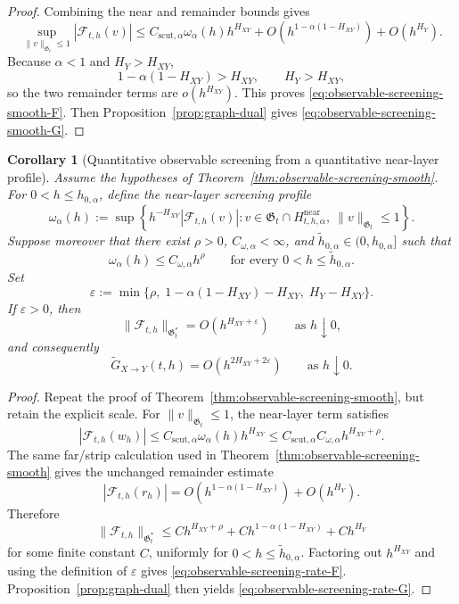 \documentclass[11pt,a4paper]{amsart}
\theoremstyle{plain}
\newtheorem{corollary}[theorem]{Corollary}
\theoremstyle{definition}
\theoremstyle{remark}
\begin{document}
\begin{proof}
Combining the near and remainder bounds gives
\[
\sup_{\|v\|_{\mathfrak G_t}\le1}
|\mathcal F_{t,h}(v)|
\le
C_{\mathrm{scut},\alpha}\omega_\alpha(h)h^{H_{XY}}
+
O\!\left(h^{1-\alpha(1-H_{XY})}\right)
+
O(h^{H_Y}).
\]
Because \(\alpha<1\) and \(H_Y>H_{XY}\),
\[
1-\alpha(1-H_{XY})>H_{XY},
\qquad
H_Y>H_{XY},
\]
so the two remainder terms are \(o(h^{H_{XY}})\). This proves
\eqref{eq:observable-screening-smooth-F}. Then Proposition~\ref{prop:graph-dual} gives
\eqref{eq:observable-screening-smooth-G}.
\end{proof}

\begin{corollary}[Quantitative observable screening from a quantitative near-layer profile]
\label{cor:observable-screening-rate}
Assume the hypotheses of Theorem~\ref{thm:observable-screening-smooth}.  For \(0<h\le h_{0,\alpha}\),
define the near-layer screening profile
\[
\omega_\alpha(h)
:=
\sup\left\{
h^{-H_{XY}}\left|\mathcal F_{t,h}(v)\right|:
v\in\mathfrak G_t\cap H_{t,h,\alpha}^{\mathrm{near}},
\ \|v\|_{\mathfrak G_t}\le1
\right\}.
\]
Suppose moreover that there exist \(\rho>0\), \(C_{\omega,\alpha}<\infty\), and
\(\widetilde h_{0,\alpha}\in(0,h_{0,\alpha}]\) such that
\[
\omega_\alpha(h)\le C_{\omega,\alpha}h^\rho
\qquad\text{for every }0<h\le \widetilde h_{0,\alpha}.
\]
Set
\[
\varepsilon
:=
\min\!\bigl\{\rho,\;1-\alpha(1-H_{XY})-H_{XY},\;H_Y-H_{XY}\bigr\}.
\]
If \(\varepsilon>0\), then
\begin{equation}\label{eq:observable-screening-rate-F}
\|\mathcal F_{t,h}\|_{\mathfrak G_t^*}
=
O(h^{H_{XY}+\varepsilon})
\qquad\text{as }h\downarrow0,
\end{equation}
and consequently
\begin{equation}\label{eq:observable-screening-rate-G}
\widetilde G_{X\to Y}(t,h)
=
O(h^{2H_{XY}+2\varepsilon})
\qquad\text{as }h\downarrow0.
\end{equation}
\end{corollary}

\begin{proof}
Repeat the proof of Theorem~\ref{thm:observable-screening-smooth}, but retain the explicit scale.
For \(\|v\|_{\mathfrak G_t}\le1\), the near-layer term satisfies
\[
|\mathcal F_{t,h}(w_h)|
\le
C_{\mathrm{scut},\alpha}\omega_\alpha(h)h^{H_{XY}}
\le
C_{\mathrm{scut},\alpha}C_{\omega,\alpha}h^{H_{XY}+\rho}.
\]
The same far/strip calculation used in Theorem~\ref{thm:observable-screening-smooth} gives the
unchanged remainder estimate
\[
|\mathcal F_{t,h}(r_h)|
=
O\!\left(h^{1-\alpha(1-H_{XY})}\right)
+
O(h^{H_Y}).
\]
Therefore
\[
\|\mathcal F_{t,h}\|_{\mathfrak G_t^*}
\le
C h^{H_{XY}+\rho}
+
C h^{1-\alpha(1-H_{XY})}
+
C h^{H_Y}
\]
for some finite constant \(C\), uniformly for \(0<h\le \widetilde h_{0,\alpha}\).  Factoring out
\(h^{H_{XY}}\) and using the definition of \(\varepsilon\) gives
\eqref{eq:observable-screening-rate-F}.  Proposition~\ref{prop:graph-dual} then yields
\eqref{eq:observable-screening-rate-G}.
\end{proof}
\end{document}
